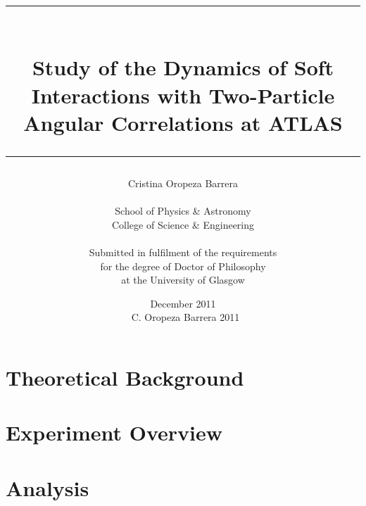 \documentclass[12pt,a4paper,oneside]{book}
\title{\rule{14cm}{1mm} \\ Study of the Dynamics of Soft Interactions with Two-Particle Angular Correlations at ATLAS \\ \rule{14cm}{1mm}}
\author{Cristina Oropeza Barrera \\ \bigskip \\ \large School of Physics \& Astronomy \\ \large College of Science \& Engineering \\ \bigskip \\ Submitted in fulfilment of the requirements \\ for the degree of Doctor of Philosophy \\ at the University of Glasgow}
\date{December 2011 \\ \bigskip \bigskip \bigskip \bigskip \bigskip \bigskip \textcopyright\ C. Oropeza Barrera 2011}
\begin{document}
\maketitle

\begin{doublespace}

	
	
	
	
	
	
	
	\tableofcontents
	 
	\listoffigures
	
	\listoftables
	\clearpage

	\pagestyle{fancy}
	\fancyhead[LO,LE]{\nouppercase{\rightmark}}
	
	
	
	
	\part{Theoretical Background} 

	

	
	
	\part{Experiment Overview}

	

	
	
	

	\part{Analysis}
	
	

	

	

	


	

	

	\clearpage
	
	
	\clearpage
	
\end{doublespace}
\end{document}

